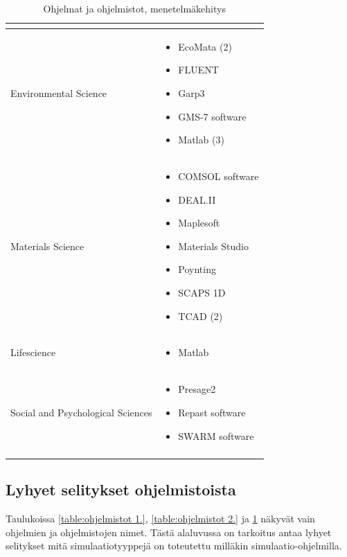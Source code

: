 \documentclass[utf8]{gradu3}
\begin{document}
\begin{longtable}[h]{|p{5cm}|p{8cm}|}
\begin{itemize}
    \end{itemize} \\
    \hline
    Environmental Science & \begin{itemize}
        \item EcoMata (2)
        \item FLUENT
        \item Garp3
        \item GMS-7 software
        \item Matlab (3)
    \end{itemize} \\
    \hline
    Materials Science & \begin{itemize}
        \item COMSOL software
        \item DEAL.II 
        \item Maplesoft
        \item Materials Studio
        \item Poynting
        \item SCAPS 1D
        \item TCAD (2)
    \end{itemize} \\
    \hline
    Lifescience & \begin{itemize}
        \item Matlab
    \end{itemize} \\
    \hline
    Social and Psychological Sciences & \begin{itemize}
        \item Presage2
        \item Repast software
        \item SWARM software
    \end{itemize} \\
    \hline
    \caption{Ohjelmat ja ohjelmistot, menetelmäkehitys}
    \label{table:ohjelmistot 3.}
\end{longtable}

\subsection{Lyhyet selitykset ohjelmistoista}
Taulukoissa \ref{table:ohjelmistot 1.}, \ref{table:ohjelmistot 2.} 
ja \ref{table:ohjelmistot 3.} näkyvät vain ohjelmien ja ohjelmistojen nimet.
Tästä alaluvussa on tarkoitus antaa lyhyet selitykset mitä simulaatiotyyppejä 
on toteutettu milläkin simulaatio-ohjelmilla. 
\end{document}
